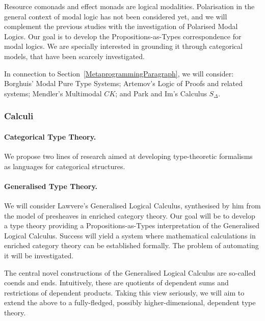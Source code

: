 \documentclass[11pt,twocolumn]{article}
\newcommand{\hl}[1]{#1}%
\newcommand{\eg}{\emph{eg.}}
\begin{document}
Resource comonads and effect monads are logical modalities.  Polarisation in
the general context of modal logic has not been considered yet, and we will
complement the previous studies with the \hl{investigation} of Polarised
Modal Logics.  Our \hl{goal} is to develop the Propositions-as-Types
correspondence for modal logics.  We are specially interested in grounding it
through categorical models, that have been scarcely investigated.

In connection to Section~\ref{MetaprogrammingParagraph}, we will 
consider: 
%
Borghuis' Modal Pure Type Systems; %
%
Artemov's Logic of Proofs %
and related systems;
%
Mendler's Multimodal $CK$; %
and
%
Park and Im's Calculus $S_\Delta$. %

\subsubsection{Calculi}
\label{CalculiSubsection}

\paragraph*{Categorical Type Theory.}

We propose two lines of \hl{research} aimed at developing type-theoretic
formalisms as languages for categorical structures.

\paragraph{Generalised Type Theory.}
\label{GeneralisedTypeTheoryParagraph}

We will consider Lawvere's Generalised Logical Calculus, %
synthesised by him from the model of presheaves in enriched category theory.
Our \hl{goal} will be to develop a type theory providing a
Propositions-as-Types interpretation of the Generalised Logical Calculus.
Success will yield a system where mathematical calculations in enriched
category theory can be established formally.  The problem of automating it
will be investigated.

The central novel constructions of the Generalised Logical Calculus are
so-called coends and ends.  Intuitively, these are quotients of dependent sums
and restrictions of dependent products.  Taking this view seriously, we will
\hl{aim} to extend the above to a fully-fledged, possibly
higher-dimensional, dependent type theory.  
\end{document}
